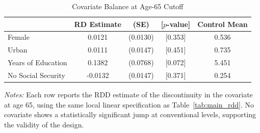 \begin{table}[t]
\centering
\begin{threeparttable}
\caption{Covariate Balance at Age-65 Cutoff}
\label{tab:balance}
\begin{tabular}{lcccc}
\hline\hline
  & RD Estimate & (SE) & [$p$-value] & Control Mean \\
\hline
  Female & 0.0121 & (0.0130) & [0.353] & 0.536 \\
  Urban & 0.0111 & (0.0147) & [0.451] & 0.735 \\
  Years of Education & 0.1382 & (0.0768) & [0.072] & 5.451 \\
  No Social Security & -0.0132 & (0.0147) & [0.371] & 0.254 \\
\hline\hline
\end{tabular}
\begin{tablenotes}
\item \textit{Notes:} Each row reports the RDD estimate of the discontinuity in the covariate at age 65, using the same local linear specification as Table~\ref{tab:main_rdd}. No covariate shows a statistically significant jump at conventional levels, supporting the validity of the design.
\end{tablenotes}
\end{threeparttable}
\end{table}
